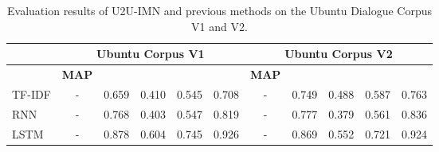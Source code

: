 \documentclass[journal]{IEEEtran}
\begin{document}
    \begin{table*}[!hbt]
     \small
     \caption{Evaluation results of U2U-IMN and previous methods on the Ubuntu Dialogue Corpus V1 and V2.}
     \label{tab3}
     \centering
     \begin{tabular}{l|c|c|c|c|c|c|c|c|c|c}
      \toprule
                             & \multicolumn{5}{c|}{Ubuntu Corpus V1} & \multicolumn{5}{c}{Ubuntu Corpus V2} \\
      \hline
                             & \textbf{MAP} &  &  &  &              & \textbf{MAP} &  &  &  & \\
      \hline
       TF-IDF \cite{DBLP:conf/sigdial/LowePSP15,DBLP:journals/dad/LowePSCLP17}    &-& 0.659 & 0.410 & 0.545 & 0.708 &-& 0.749 & 0.488 & 0.587 & 0.763 \\
       RNN \cite{DBLP:conf/sigdial/LowePSP15,DBLP:journals/dad/LowePSCLP17}       &-& 0.768 & 0.403 & 0.547 & 0.819 &-& 0.777 & 0.379 & 0.561 & 0.836 \\
       LSTM \cite{DBLP:conf/sigdial/LowePSP15,DBLP:journals/dad/LowePSCLP17}      &-& 0.878 & 0.604 & 0.745 & 0.926 &-& 0.869 & 0.552 & 0.721 & 0.924 \\


\end{tabular}
\end{table*}
\end{document}
